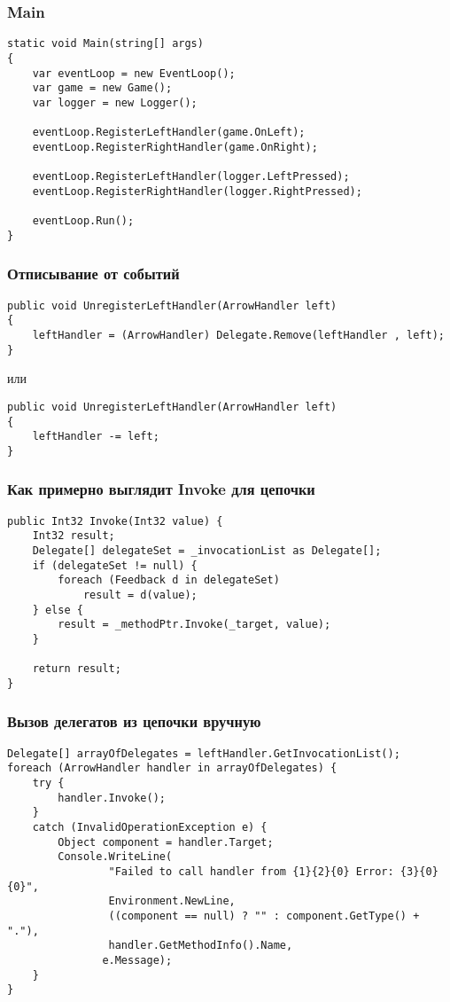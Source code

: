 \documentclass[xetex,mathserif,serif]{beamer}
\begin{document}
	\begin{frame}[fragile]
		\frametitle{Main}
		\begin{verbatim}
static void Main(string[] args)
{
    var eventLoop = new EventLoop();
    var game = new Game();
    var logger = new Logger();

    eventLoop.RegisterLeftHandler(game.OnLeft);
    eventLoop.RegisterRightHandler(game.OnRight);

    eventLoop.RegisterLeftHandler(logger.LeftPressed);
    eventLoop.RegisterRightHandler(logger.RightPressed);

    eventLoop.Run();
}
		\end{verbatim}
	\end{frame}

	\begin{frame}[fragile]
		\frametitle{Отписывание от событий}
		\begin{verbatim}
public void UnregisterLeftHandler(ArrowHandler left)
{
    leftHandler = (ArrowHandler) Delegate.Remove(leftHandler , left);
}
		\end{verbatim}
		\vspace{3mm}
		или
		\begin{verbatim}
public void UnregisterLeftHandler(ArrowHandler left)
{
    leftHandler -= left;
}
		\end{verbatim}
	\end{frame}

	\begin{frame}[fragile]
		\frametitle{Как примерно выглядит Invoke для цепочки}
		\begin{verbatim}
public Int32 Invoke(Int32 value) {
    Int32 result;
    Delegate[] delegateSet = _invocationList as Delegate[];
    if (delegateSet != null) {
        foreach (Feedback d in delegateSet)
            result = d(value);
    } else {
        result = _methodPtr.Invoke(_target, value);
	}
	
    return result;
}
		\end{verbatim}
	\end{frame}

	\begin{frame}[fragile]
		\frametitle{Вызов делегатов из цепочки вручную}
		\begin{small}
			\begin{verbatim}
Delegate[] arrayOfDelegates = leftHandler.GetInvocationList();
foreach (ArrowHandler handler in arrayOfDelegates) {
    try {
        handler.Invoke();
    }
    catch (InvalidOperationException e) {
        Object component = handler.Target;
        Console.WriteLine(
                "Failed to call handler from {1}{2}{0} Error: {3}{0}{0}",
                Environment.NewLine,
                ((component == null) ? "" : component.GetType() + "."),
                handler.GetMethodInfo().Name,
               e.Message);
    }
}
			\end{verbatim}
		\end{small}
	\end{frame}
\end{document}
